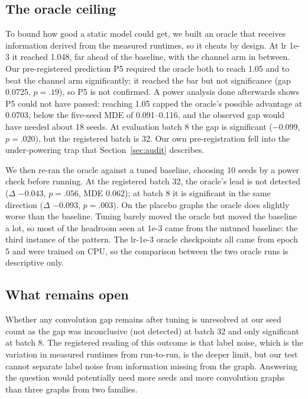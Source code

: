 \subsection{The oracle ceiling}
\label{sec:oracle}
To bound how good a static model could get, we built an oracle that receives information derived from
the measured runtimes, so it cheats by design. At lr 1e-3 it reached 1.048, far ahead of the baseline,
with the channel arm in between. Our pre-registered prediction P5 required the oracle both to reach 1.05
and to beat the channel arm significantly; it reached the bar but not significance (gap 0.0725,
$p = .19$), so P5 is not confirmed. A power analysis done afterwards shows P5 could not have passed:
reaching 1.05 capped the oracle's possible advantage at 0.0703, below the five-seed MDE of
0.091--0.116, and the observed gap would have needed about 18 seeds. At evaluation batch 8 the gap is
significant ($-0.099$, $p = .020$), but the registered batch is 32. Our own pre-registration fell into
the under-powering trap that Section~\ref{sec:audit} describes.

We then re-ran the oracle against a tuned baseline, choosing 10 seeds by a power check before running.
At the registered batch 32, the oracle's lead is not detected ($\Delta$ $-0.043$, $p = .056$, MDE
0.062); at batch 8 it is significant in the same direction ($\Delta$ $-0.093$, $p = .003$). On the
placebo graphs the oracle does slightly worse than the baseline. Tuning barely moved the oracle but
moved the baseline a lot, so most of the headroom seen at 1e-3 came from the untuned baseline: the third
instance of the pattern. The lr-1e-3 oracle checkpoints all came from epoch 5 and were trained on CPU,
so the comparison between the two oracle runs is descriptive only.

\subsection{What remains open}
\label{sec:open}
Whether any convolution gap remains after tuning is unresolved at our seed count as the gap was
inconclusive (not detected) at batch 32 and only significant at batch 8. The registered reading of
this outcome is that label noise, which is the variation in measured runtimes from run-to-run, is
the deeper limit, but our test cannot separate label noise from information missing from the graph.
Answering the question would potentially need more seeds and more convolution graphs than three
graphs from two families.
